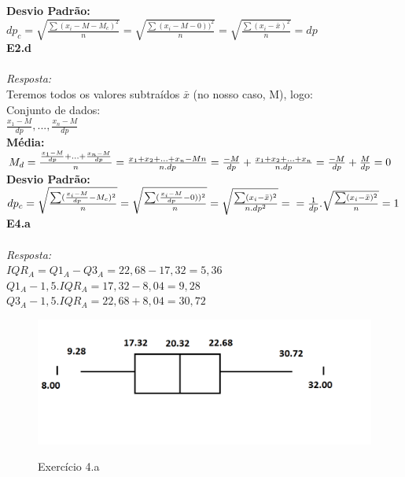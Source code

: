 \documentclass{article}
\begin{document}
	\textbf {Desvio Padrão:}\\
	
	$dp_c = \sqrt{\frac {\sum (x_i - M - M_c)^2}{n}} = \sqrt{\frac {\sum (x_i - M - 0))^2}{n}} = \sqrt{\frac {\sum (x_i - \bar{x})^2}{n}} = dp$\\
	
	\textbf {E2.d} 
	\\ \\
	\textit {Resposta:} \\
	
	Teremos todos os valores subtraídos $\bar{x}$ (no nosso caso, M), logo:\\
	
	Conjunto de dados:\\
	
	$\frac{x_1 - M}{dp}, ... , \frac{x_n - M}{dp}$\\
	
	\textbf {Média:}\\
	
	$M_d = \frac{\frac{x_1 - M}{dp} + ... + \frac{x_n - M}{dp}}{n} = \frac{x_1 + x_2 + ... + x_n - Mn}{n.dp} = \frac{-M}{dp} + \frac{x_1 + x_2 + ... + x_n}{n.dp} = \\  \\
	\frac{-M}{dp} + \frac{M}{dp} = 0$\\
	
	\textbf {Desvio Padrão:}\\
	
	$dp_c = \sqrt{\frac {\sum (\frac{x_i - M}{dp} - M_c)^2}{n}} = \sqrt{\frac {\sum (\frac{x_i - M}{dp} - 0))^2}{n}} = \sqrt{\frac {\sum (x_i - \bar{x})^2}{n.dp^2}} =\\ \\
	= \frac{1}{dp} . \sqrt{\frac {\sum (x_i - \bar{x})^2}{n}} = 1$\\
	
	\textbf {E4.a} 
	\\ \\
	\textit {Resposta:} \\
	
	$IQR_A = Q1_A - Q3_A = 22,68 - 17,32 = 5,36$\\
	
	$Q1_A - 1,5 . IQR_A =  17,32 - 8,04 = 9,28$\\
	
	$Q3_A - 1,5 . IQR_A = 22,68 + 8,04 = 30,72$\\
	
	\begin{figure}[h]
		\caption{Exercício 4.a}
		\centering %
		\includegraphics[width=16cm]{q4a-a.png} %
		\label{figura: Região A}
	\end{figure}

    
	
\end{document}
